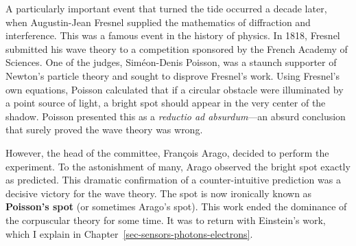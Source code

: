 \documentclass[
  letterpaper,
]{book}
\begin{document}
A particularly important event that turned the tide occurred a decade
later, when Augustin-Jean Fresnel supplied the mathematics of
diffraction and interference. This was a famous event in the history of
physics. In 1818, Fresnel submitted his wave theory to a competition
sponsored by the French Academy of Sciences. One of the judges,
Siméon-Denis Poisson, was a staunch supporter of Newton's particle
theory and sought to disprove Fresnel's work. Using Fresnel's own
equations, Poisson calculated that if a circular obstacle were
illuminated by a point source of light, a bright spot should appear in
the very center of the shadow. Poisson presented this as a
\emph{reductio ad absurdum}---an absurd conclusion that surely proved
the wave theory was wrong.

However, the head of the committee, François Arago, decided to perform
the experiment. To the astonishment of many, Arago observed the bright
spot exactly as predicted. This dramatic confirmation of a
counter-intuitive prediction was a decisive victory for the wave theory.
The spot is now ironically known as \textbf{Poisson's spot} (or
sometimes Arago's spot). This work ended the dominance of the
corpuscular theory for some time. It was to return with Einstein's work,
which I explain in Chapter~\ref{sec-sensors-photons-electrons}.
\end{document}
